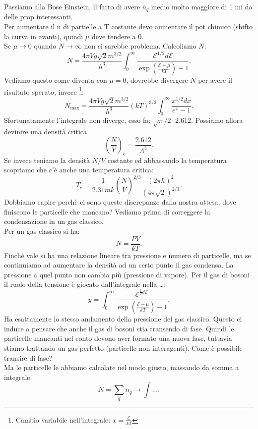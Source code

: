 Passiamo alla Bose Einstein, il fatto di avere $\overline{n}_{q}$ medio molto maggiore di 1 mi da delle prop interessanti. \\
Per aumentare il n di partielle a T costante devo aumentare il pot chimico (shifto la curva in avanti), quindi $\mu $ deve tendere a 0. \\
Se $\mu \to 0$ quando $N\to \infty$ non ci sarebbe problema. Calcoliamo $N$:
\[
	N = \frac{4\pi V g \sqrt{2} m ^{3 /2}}{h^3}\int_{0}^{\infty} \frac{\mathcal{E} ^{1 /2}d\mathcal{E} }{\exp\left( \frac{\mathcal{E} -\mu }{kT} \right) -1} 
.\] 
Vediamo questo come diventa con $\mu = 0$, dovrebbe divergere $N$ per avere il risultato sperato, invece \footnote{Cambio variabile nell'integrale: $x = \frac{\mathcal{E} }{kT}$}:
\[
	N_{\text{max}}= \frac{4\pi V g \sqrt{2} m ^{3 /2}}{h^3} \left( kT \right)^{3 /2} \int_{0}^{\infty} \frac{x^{1 /2}dx}{e^{x}-1} 
.\] 
Sfortunatamente l'integrale non diverge, esso fa: $ \sqrt{\pi} /2 \cdot 2.612$. Possiamo allora devinire una densità critica
\[
	\left( \frac{N}{V} \right)_{\text{c}}= \frac{2.612}{\Lambda ^3}
.\] 
Se invece teniamo la densità $N /V$ costante ed abbassando la temperatura scopriamo che c'è anche una temperatura critica:
\[
	T_{c} = \frac{1}{2.31 m k} \left( \frac{N}{V} \right)^{2 /3} \frac{\left( 2\pi \hbar  \right) ^2}{\left( 4\pi \sqrt{2}  \right) ^{2 /3}}
.\] 
Dobbiamo capire perchè ci sono queste discrepanze dalla nostra attesa, dove finiscono le particelle che mancano? Vediamo prima di correggere la condensazione in un gas classico.\\
Per un gas classico si ha:
\[
	N = \frac{PV}{kT}
.\] 
Finchè vale si ha una relazione lineare tra pressione e numero di particelle, ma se continuiamo ad aumentare la densità ad un certo punto il gas condensa. La pressione a quel punto non cambia più (pressione di vapore). Per il gas di bosoni il ruolo della tensione è giocato dall'integrale nella \ldots:
\[
	y =\int_{0}^{\infty} \frac{\mathcal{E} ^{\frac{1}{2}d\mathcal{E} }}{\exp\left( \frac{\mathcal{E} -\mu }{kT} \right)-1 } 
.\] 
Ha esattamente lo stesso andamento della pressione del gas classico. Questo ci induce a pensare che anche il gas di bosoni stia transendo di fase. Quindi le particelle mancanti nel conto devono aver formato una nuova fase, tuttavia stiamo trattando un gas perfetto (particelle non interagenti). Come è possibile transire di fase? \\
Ma le particelle le abbiamo calcolate nel modo giusto, massando da somma a integrale:
\[
	N = \sum_{q}^{} \overline{n}_{q} \to \int\ldots
.\] 
